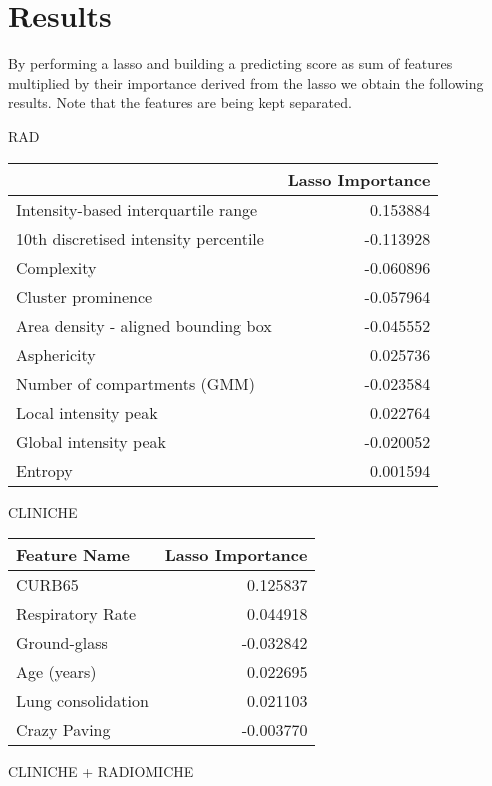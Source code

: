 \chapter{Results}
By performing a lasso and building a predicting score as sum of features multiplied by their importance derived from the lasso we obtain the following results. Note that the features are being kept separated. 


RAD
\begin{tabular}{lr}
\toprule
{} &  Lasso Importance \\
\midrule
Intensity-based interquartile range   &          0.153884 \\
10th discretised intensity percentile &         -0.113928 \\
Complexity                            &         -0.060896 \\
Cluster prominence                    &         -0.057964 \\
Area density - aligned bounding box   &         -0.045552 \\
Asphericity                           &          0.025736 \\
Number of compartments (GMM)          &         -0.023584 \\
Local intensity peak                  &          0.022764 \\
Global intensity peak                 &         -0.020052 \\
Entropy                               &          0.001594 \\
\bottomrule
\end{tabular}


CLINICHE

\begin{tabular}{lr}
\toprule
{Feature Name} &  Lasso Importance \\
\midrule
CURB65             &          0.125837 \\
Respiratory Rate   &          0.044918 \\
Ground-glass       &         -0.032842 \\
Age (years)        &          0.022695 \\
Lung consolidation &          0.021103 \\
Crazy Paving       &         -0.003770 \\
\bottomrule
\end{tabular}

CLINICHE + RADIOMICHE 

